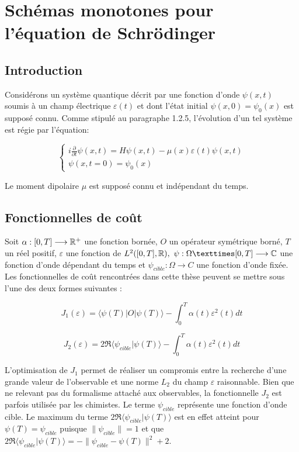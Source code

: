 \chapter{Schémas monotones pour l'équation de Schrödinger}

\section{Introduction}

Considérons un système quantique décrit par une fonction d’onde $\psi(x, t)$ soumis à un champ électrique $\varepsilon(t)$ et dont l’état initial $\psi(x, 0) = \psi_0 (x)$ est supposé connu. Comme stipulé au paragraphe 1.2.5, l’évolution d’un tel système est régie par l’équation:

\begin{equation}
\begin{cases}
i \frac{\partial}{\partial t} \psi (x,t) = H\psi(x,t) - \mu(x)\varepsilon(t)\psi(x,t)\\
\psi(x,t=0)=\psi_0(x)
\end{cases}
\end{equation}

Le moment dipolaire $\mu$ est supposé connu et indépendant du temps.

\section{Fonctionnelles de coût}
Soit $\alpha : [0, T ] \longrightarrow \mathbb R^+$ une fonction bornée, $O$ un opérateur symétrique borné, $T$ un réel positif, $\varepsilon$ une fonction de $L^2 ([0, T ], \R),\  \psi : \Omega × [0, T ] \longrightarrow \C$ une fonction d’onde dépendant du temps et $\psi_{cible} : \Omega \longrightarrow C$ une fonction d’onde fixée.
\\Les fonctionnelles de coût rencontrées dans cette thèse peuvent se mettre sous l’une des deux formes suivantes :

\begin{equation}
J_1(\varepsilon) = \langle \psi(T)|O|\psi(T) \rangle - \int_0^T \alpha(t)\varepsilon^2(t)dt
\end{equation}

\begin{equation}
J_2(\varepsilon) = 2\Re\langle \psi_{cible}|\psi(T)\rangle - \int_0^T \alpha(t)\varepsilon^2(t)dt
\end{equation}

L’optimisation de $J_1$ permet de réaliser un compromis entre la recherche d'une grande valeur de l’observable et une norme $L_2$ du champ $\varepsilon$ raisonnable. Bien que ne relevant pas du formalisme attaché aux observables, la fonctionnelle $J_2$ est parfois utilisée par les chimistes. Le terme $\psi_{cible}$ représente une fonction d’onde cible. Le maximum du terme $2\Re\langle \psi_{cible}|\psi(T)\rangle$ est en effet atteint pour $\psi(T) = \psi_{cible}$ puisque $\lVert \psi_{cible} \rVert = 1$ et que $2\Re\langle \psi_{cible}|\psi(T)\rangle = -\lVert \psi_{cible} - \psi(T)\rVert ^2+2$.

